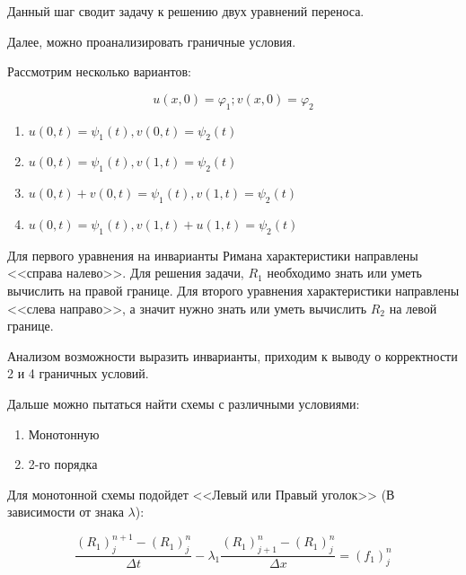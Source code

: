\documentclass[10pt,a4paper]{article}
\begin{document}
	Данный шаг сводит задачу к решению двух уравнений переноса.
	
	Далее, можно проанализировать граничные условия.
	
	Рассмотрим несколько вариантов:
	
	\begin{equation}
		u\left(x, 0\right) = \varphi_{1}; v\left(x, 0\right) = \varphi_{2}
	\end{equation}
	
	\begin{enumerate}
		\item $u\left(0, t\right) = \psi_{1}\left(t\right),
			 v\left(0, t\right) = \psi_{2}\left(t\right) $ 
		\item $u\left(0, t\right) = \psi_{1}\left(t\right),
			 v\left(1, t\right) = \psi_{2}\left(t\right) $
		\item $u\left(0, t\right) + v\left(0, t\right) = \psi_{1}\left(t\right),
			 v\left(1, t\right) = \psi_{2}\left(t\right) $
		\item $u\left(0, t\right) = \psi_{1}\left(t\right),
			 v\left(1, t\right) + u\left(1, t\right) = \psi_{2}\left(t\right) $
	\end{enumerate}
	
		
		Для первого уравнения на инварианты Римана характеристики направлены 
		<<справа налево>>. Для решения задачи, $R_{1}$ необходимо знать или 
		уметь вычислить на правой границе. Для второго уравнения характеристики 
		направлены  <<слева направо>>, а значит нужно знать или уметь вычислить 
		$R_{2}$ на левой границе. 
		
		
		Анализом возможности выразить инварианты, приходим к выводу о 
		корректности 2 и 4 граничных условий.
		
	Дальше можно пытаться найти схемы с различными условиями:
	
	\begin{enumerate}
		\item Монотонную
		\item 2-го порядка
	\end{enumerate}

	Для монотонной схемы подойдет <<Левый или Правый уголок>> (В зависимости 
	от знака $\lambda$):
	
	\begin{equation}
		\frac{\left(R_{1}\right)^{n + 1}_{j} - \left(R_{1}\right)^{n }_{j}}
		{\Delta t} - \lambda_{1}
		\frac{\left(R_{1}\right)^{n}_{j + 1} - \left(R_{1}\right)^{n}_{j}}
		{\Delta x} = \left(f_{1}\right)_{j}^{n}
	\end{equation}
	
\end{document}
